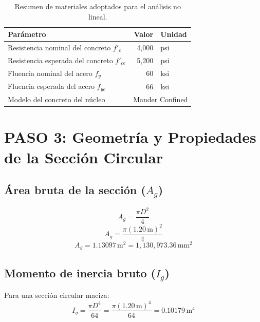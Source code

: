\documentclass[11pt,a4paper]{article}
\begin{document}
\begin{table}[H]
\centering
\caption{Resumen de materiales adoptados para el análisis no lineal.}
\begin{tabular}{p{8.0cm}r l}
\toprule
\textbf{Parámetro} & \textbf{Valor} & \textbf{Unidad}\\
\midrule
Resistencia nominal del concreto $f'_c$ & 4,000 & psi\\
Resistencia esperada del concreto $f'_{ce}$ & 5,200 & psi\\
Fluencia nominal del acero $f_y$ & 60 & ksi\\
Fluencia esperada del acero $f_{ye}$ & 66 & ksi\\
Modelo del concreto del núcleo & \multicolumn{2}{l}{Mander Confined}\\
\bottomrule
\end{tabular}
\end{table}



\section{PASO 3: Geometría y Propiedades de la Sección Circular}

\subsection{Área bruta de la sección ($A_g$)}
\begin{equation*}
A_g=\frac{\pi D^2}{4}
\end{equation*}
\begin{equation*}
A_g=\frac{\pi(1.20\,\mathrm{m})^2}{4}
\end{equation*}
\begin{equation*}
\boxed{A_g=1.13097\,\mathrm{m}^2=1{,}130{,}973.36\,\mathrm{mm}^2}
\end{equation*}

\subsection{Momento de inercia bruto ($I_g$)}
Para una sección circular maciza:
\begin{equation*}
I_g=\frac{\pi D^4}{64}
  =\frac{\pi(1.20\,\mathrm{m})^4}{64}
  =\boxed{0.10179\,\mathrm{m}^4}
\end{equation*}
\end{document}
